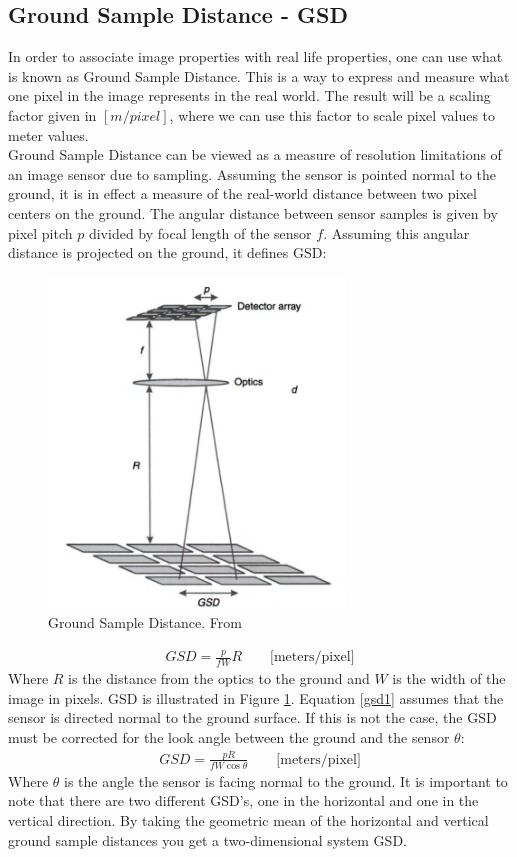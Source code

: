 \subsection{Ground Sample Distance - GSD}
In order to associate image properties with real life properties, one can use what is known as Ground Sample Distance. This is a way to express and measure what one pixel in the image represents in the real world. The result will be a scaling factor given in $[m/pixel]$, where we can use this factor to scale pixel values to meter values.\\

Ground Sample Distance can be viewed as a measure of resolution limitations of an image sensor due to sampling\cite{s}. Assuming the sensor is pointed normal to the ground, it is in effect a measure of the real-world distance between two pixel centers on the ground. The angular distance between sensor samples is given by pixel pitch $p$ divided by focal length of the sensor $f$. Assuming this angular distance is projected on the ground, it defines GSD:
\begin{figure}
  \centering
  \includegraphics[width=0.7\textwidth]{fig/GSDimage}
  \caption{Ground Sample Distance. From \cite{s}}
  \label{fig:gsd}
\end{figure}
\begin{align}
    GSD = \frac{p}{fW}R \quad\quad\textrm{[meters/pixel]}
    \label{gsd1}
\end{align}
Where $R$ is the distance from the optics to the ground and $W$ is the width of the image in pixels. GSD is illustrated in Figure \ref{fig:gsd}. Equation \ref{gsd1} assumes that the sensor is directed normal to the ground surface. If this is not the case, the GSD must be corrected for the look angle between the ground and the sensor $\theta$:
\begin{align}
    GSD = \frac{pR}{fW\cos{\theta}}\quad\quad\textrm{[meters/pixel]}
    \label{gsd2}
\end{align}
Where $\theta$ is the angle the sensor is facing normal to the ground. It is important to note that there are two different GSD's, one in the horizontal and one in the vertical direction. By taking the geometric mean of the horizontal and vertical ground sample distances you get a two-dimensional system GSD\cite{s}.
